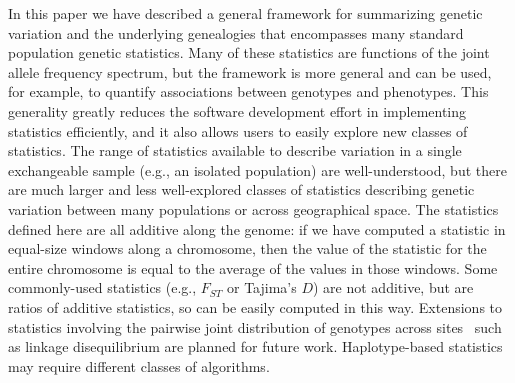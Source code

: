 \documentclass{article}
\newcommand{\tiw}{w_\text{total}} %
\begin{document}
In this paper we have described a general framework for summarizing genetic variation
and the underlying genealogies
that encompasses many standard population genetic statistics.
Many of these statistics are functions of the joint allele frequency spectrum,
but the framework is more general and can be used,
for example, to quantify associations between genotypes and phenotypes.
This generality greatly reduces the software development effort in
implementing statistics efficiently,
and it also allows users to easily explore new classes of statistics.
The range of statistics available to describe variation in a single exchangeable sample
(e.g., an isolated population) are well-understood,
but there are much larger and less well-explored classes of statistics
describing genetic variation between many populations
or across geographical space.
The statistics defined here are all additive along the genome:
if we have computed a statistic in equal-size windows along a chromosome,
then the value of the statistic for the entire chromosome is equal to
the average of the values in those windows.
Some commonly-used statistics (e.g., $F_{ST}$ or Tajima's $D$)
are not additive, but are ratios of additive statistics, so can be easily computed in this way.
Extensions to statistics involving the pairwise joint distribution of genotypes across
sites~\citep{hudson2001twolocus} such as linkage disequilibrium are planned for future work.
Haplotype-based statistics may require different classes of algorithms.

\end{document}
